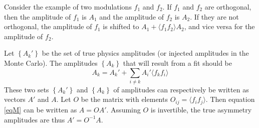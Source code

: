 \documentclass[12pt]{article}
\begin{document}
Consider the example of two modulations $f_1$ and $f_2$.
If $f_1$ and $f_2$ are orthogonal, then the amplitude of $f_1$ is $A_1$ and the
amplitude of $f_2$ is $A_2$.  If they are not orthogonal, 
the amplitude of $f_1$ is shifted to $A_1+\langle f_1f_2\rangle A_2$,
and vice versa for the amplitude of $f_2$.

Let $\left\{A_k'\right\}$ be the set of true physics amplitudes (or injected
amplitudes in the Monte Carlo).  The amplitudes $\left\{A_k\right\}$ that will result
from a fit should be 
\begin{equation}
A_k=A_k'+\sum_{i\neq k}{A_i'\langle f_kf_i\rangle}
\label{eqM}
\end{equation}
These two sets $\left\{A_k'\right\}$ and $\left\{A_k\right\}$ of amplitudes can
respectively be written as vectors $A'$ and $A$. Let $O$ be the matrix with
elements $O_{ij}=\langle f_if_j\rangle$. Then equation \ref{eqM} can be written
as $A=OA'$. Assuming $O$ is invertible, the true asymmetry amplitudes are thus
$A'=O^{-1}A$.
\end{document}
